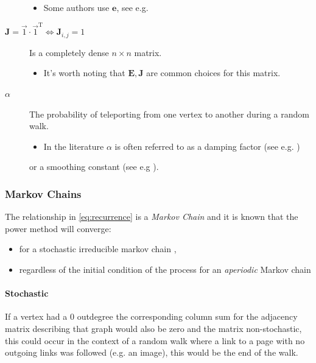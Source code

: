 \documentclass[11pt]{article}
\begin{document}
\begin{description}
\begin{itemize}
\item Some authors use \(\mathbf{e}\), see e.g. \cite{langvilleGooglePageRankScience2012}
\end{itemize}
\item[{\(\mathbf{J} = \vec{1}\cdot \vec{1}^{\mathrm{T}} \iff \mathbf{J}_{i,j} = 1\)}] Is a completely dense \(n \times n\) matrix.
\begin{itemize}
\item It's worth noting that \(\mathbf{E}, \mathbf{J}\) are common choices for this matrix.
\end{itemize}
\item[{\(\alpha\)}] The probability of teleporting from one vertex to another during a random walk.
\begin{itemize}
\item In the literature \(\alpha\) is often referred to as a damping factor (see e.g.  \cite{berkhoutRankingNodesGeneral2018a,brinkmeierPageRankRevisited2006a,fuDampingFactorGoogle2006,kamvarAdaptiveMethodsComputation2004b,bianchiniPageRank2005})
\end{itemize}
or a smoothing constant (see e.g \cite{koppelMeasuringDirectIndirect2014}).
\end{description}

\subsubsection{Markov Chains}
\label{sec:org26ad1e3}
The relationship in \eqref{eq:recurrence} is a \emph{Markov Chain} and it is known that the power method will converge:

\begin{itemize}
\item for a stochastic irreducible markov chain \cite[.5]{foussAlgorithmsModelsNetwork2016},
\item regardless of the initial condition of the process for an \emph{aperiodic} Markov chain \cite[]{langvilleGooglePageRankScience2012}
\end{itemize}

\paragraph{Stochastic}
\label{sec:orgf71219c}
If a vertex had a 0 outdegree the corresponding column sum for the adjacency
matrix describing that graph would also be zero and the matrix non-stochastic,
this could occur in the context of a random walk where a link to a page with no
outgoing links was followed (e.g. an image), this would be the end of the
walk.
\end{document}
